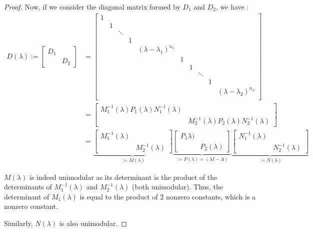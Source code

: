\documentclass[11pt]{article}
\begin{document}
\begin{proof}
Now, if we consider the diagonal matrix formed by $D_1$ and $D_2$, we have :
\begin{align*}D(\lambda):=
\begin{bmatrix}
D_1 &\\
& D_2
\end{bmatrix} &= \begin{bmatrix}
1 & & & &&&&&\\
  &1& & &&&&&\\
  & &\ddots& &&&&&\\
  & & & 1& &&&&\\
  & & &  &(\lambda - \lambda_1)^{n_1}&&&&\\
  &&&&&1 & & & &\\
  &&&&&&1& & &\\
  &&&&&& &\ddots& &\\
  &&&&&& & & 1& \\
  &&&&&&& &  &(\lambda - \lambda_2)^{n_2}\\
\end{bmatrix}\\
&=\begin{bmatrix}
M_1^{-1}(\lambda)P_1(\lambda) N_1^{-1}(\lambda) &\\
& M_2^{-1}(\lambda)P_2(\lambda) N_2^{-1}(\lambda)
\end{bmatrix}\\
&=
\underbrace{\begin{bmatrix}
M_1^{-1}(\lambda) &\\
& M_2^{-1}(\lambda)
\end{bmatrix}}_{:=M(\lambda)}
\underbrace{\begin{bmatrix}
P_1\lambda) &\\
& P_2(\lambda)
\end{bmatrix}}_{:= P(\lambda) = (\lambda I - A)}
\underbrace{\begin{bmatrix}
N_1^{-1}(\lambda) &\\
& N_2^{-1}(\lambda)
\end{bmatrix}}_{:=N(\lambda)}
\end{align*}

$M(\lambda)$ is indeed unimodular as its determinant is the product of the determinants of $M_1^{-1}(\lambda)$ and $M_2^{-1}(\lambda)$ (both unimodular). Thus, the determinant of $M_1(\lambda)$ is equal to the product of 2 nonzero constants, which is a nonzero constant.

Similarly, $N(\lambda)$ is also unimodular.


\end{proof}
\end{document}
